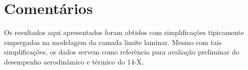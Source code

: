 \documentclass[12pt]{article}
\begin{document}
	\section*{Coment\'arios}
	
		Os resultados aqui apresentados foram obtidos com simplifica\c{c}\~oes tipicamente empregadas na modelagem da camada limite laminar. Mesmo com tais simplifica\c{c}\~oes, os dados servem como refer\^encia para avalia\c{c}\~ao preliminar do desempenho aerodin\^amico e t\'ermico do 14-X.
\end{document}
